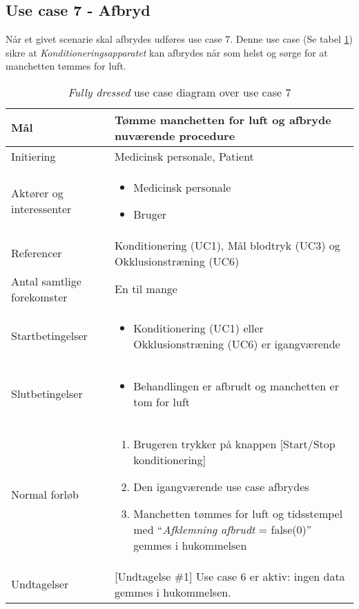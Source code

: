 	\subsection{Use case 7 - Afbryd}
	Når et givet scenarie skal afbrydes udføres use case 7. Denne use case (Se tabel \ref{tab:uc7}) sikre at \textit{Konditioneringsapparatet} kan afbrydes når som helst og sørge for at manchetten tømmes for luft. 
	\begin{table}[H]
			\begin{center}
			\begin{tabular}{ | p{} | p{}| } 
				\hline
				Mål & Tømme manchetten for luft og afbryde nuværende procedure \\ 
				\hline
				Initiering &  Medicinsk personale, Patient\\
				\hline
				Aktører og interessenter & 
				\begin{itemize}
					\item Medicinsk personale 
					\item Bruger 
				\end{itemize} \\ 
				\hline
				Referencer & Konditionering (UC1), Mål blodtryk (UC3) og Okklusionstræning (UC6) \\ 
				\hline
				Antal samtlige forekomster & En til mange \\ 
				\hline	
				Startbetingelser & 
				\begin{itemize}
					\item Konditionering (UC1) eller Okklusionstræning (UC6) er igangværende				\end{itemize} \\ 
				\hline
				Slutbetingelser & 
				\begin{itemize}
					\item Behandlingen er afbrudt og manchetten er tom for luft
				\end{itemize} \\ 
				\hline
				Normal forløb & \begin{enumerate}
					\setlength\itemsep{0cm} %
					\item Brugeren trykker på knappen [Start/Stop konditionering]
					\item Den igangværende use case afbrydes
					\item Manchetten tømmes for luft og tidsstempel med “\textit{Afklemning afbrudt} = false(0)” gemmes i hukommelsen
					\subitem[Undtagelse \#1]
				\end{enumerate} \\ 
				\hline
				Undtagelser & [Undtagelse \#1] Use case 6 er aktiv: ingen data gemmes i hukommelsen. \\ 
				\hline
			\end{tabular}
		\end{center}
			\caption{\textit{Fully dressed} use case diagram over use case 7} \label{tab:uc7}
		\end{table}
	\newpage

		